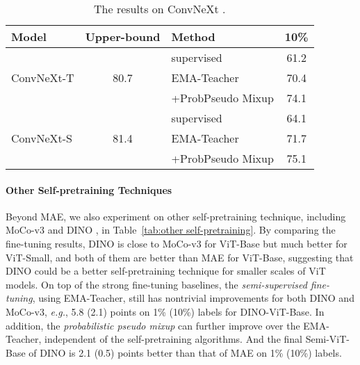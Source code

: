 \documentclass{article}
\newcommand\eg{\emph{e.g.}}
\begin{document}
\setlength{\tabcolsep}{8pt}
\begin{table}[t]
\begin{center}
\small
\begin{tabular}{lclc}
\toprule
Model & Upper-bound &Method & 10\% \\\hline
\multirow{3}{*}{ConvNeXt-T} &\multirow{3}{*}{80.7} & supervised & 61.2 \\
& &EMA-Teacher &70.4 \\
& &+ProbPseudo Mixup &74.1 \\\hline
\multirow{3}{*}{ConvNeXt-S} &\multirow{3}{*}{81.4} & supervised & 64.1 \\
& & EMA-Teacher &71.7 \\
& &+ProbPseudo Mixup &75.1 \\
\bottomrule
\end{tabular}
\caption{The results on ConvNeXt \cite{liu2022convnet}.}
\label{tab:convnext}
\end{center}\vspace{-3mm}
\end{table}


\paragraph{Other Self-pretraining Techniques}
Beyond MAE, we also experiment on other self-pretraining technique, including MoCo-v3 \cite{DBLP:conf/iccv/ChenXH21} and DINO \cite{DBLP:conf/iccv/CaronTMJMBJ21}, in Table~\ref{tab:other self-pretraining}. By comparing the fine-tuning results, DINO is close to MoCo-v3 for ViT-Base but much better for ViT-Small, and both of them are better than MAE for ViT-Base, suggesting that DINO could be a better self-pretraining technique for smaller scales of ViT models. On top of the strong fine-tuning baselines, the \emph{semi-supervised fine-tuning}, using EMA-Teacher, still has nontrivial improvements for both DINO and MoCo-v3, \eg, 5.8 (2.1) points on 1\% (10\%) labels for DINO-ViT-Base. In addition, the \emph{probabilistic pseudo mixup} can further improve over the EMA-Teacher, independent of the self-pretraining algorithms. And the final Semi-ViT-Base of DINO is 2.1 (0.5) points better than that of MAE on 1\% (10\%) labels.
\end{document}
